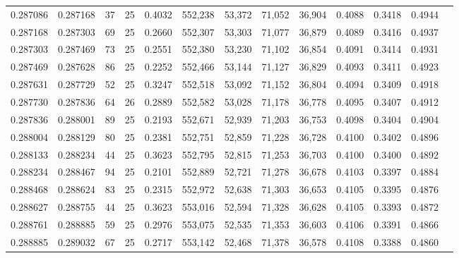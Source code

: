 \begin{tabular}{rrrrrrrrrrrrr}
0.287086 & 0.287168 &    37 &  25 &                                     0.4032 & 552,238 &  53,372 &  71,052 &  36,904 & 0.4088 & 0.3418 & 0.4944 \\
0.287168 & 0.287303 &    69 &  25 &                                     0.2660 & 552,307 &  53,303 &  71,077 &  36,879 & 0.4089 & 0.3416 & 0.4937 \\
0.287303 & 0.287469 &    73 &  25 &                                     0.2551 & 552,380 &  53,230 &  71,102 &  36,854 & 0.4091 & 0.3414 & 0.4931 \\
0.287469 & 0.287628 &    86 &  25 &                                     0.2252 & 552,466 &  53,144 &  71,127 &  36,829 & 0.4093 & 0.3411 & 0.4923 \\
0.287631 & 0.287729 &    52 &  25 &                                     0.3247 & 552,518 &  53,092 &  71,152 &  36,804 & 0.4094 & 0.3409 & 0.4918 \\
0.287730 & 0.287836 &    64 &  26 &                                     0.2889 & 552,582 &  53,028 &  71,178 &  36,778 & 0.4095 & 0.3407 & 0.4912 \\
0.287836 & 0.288001 &    89 &  25 &                                     0.2193 & 552,671 &  52,939 &  71,203 &  36,753 & 0.4098 & 0.3404 & 0.4904 \\
0.288004 & 0.288129 &    80 &  25 &                                     0.2381 & 552,751 &  52,859 &  71,228 &  36,728 & 0.4100 & 0.3402 & 0.4896 \\
0.288133 & 0.288234 &    44 &  25 &                                     0.3623 & 552,795 &  52,815 &  71,253 &  36,703 & 0.4100 & 0.3400 & 0.4892 \\
0.288234 & 0.288467 &    94 &  25 &                                     0.2101 & 552,889 &  52,721 &  71,278 &  36,678 & 0.4103 & 0.3397 & 0.4884 \\
0.288468 & 0.288624 &    83 &  25 &                                     0.2315 & 552,972 &  52,638 &  71,303 &  36,653 & 0.4105 & 0.3395 & 0.4876 \\
0.288627 & 0.288755 &    44 &  25 &                                     0.3623 & 553,016 &  52,594 &  71,328 &  36,628 & 0.4105 & 0.3393 & 0.4872 \\
0.288761 & 0.288885 &    59 &  25 &                                     0.2976 & 553,075 &  52,535 &  71,353 &  36,603 & 0.4106 & 0.3391 & 0.4866 \\
0.288885 & 0.289032 &    67 &  25 &                                     0.2717 & 553,142 &  52,468 &  71,378 &  36,578 & 0.4108 & 0.3388 & 0.4860 \\

\end{tabular}
